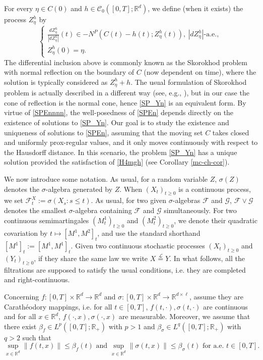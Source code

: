 \documentclass[preprint,12pt]{elsarticle}
\newcommand{\R}{\mathbb{R}}
\theoremstyle{plain}
\theoremstyle{definition}
\theoremstyle{remark}
\begin{document}
    For every $\eta\in C(0)$ and $h\in \mathcal{C}_0([0,T];\R^d)$, we define (when it exists) the process $Z^h_\eta$ by
	\begin{equation}\label{SP_Yn}
		\left\{\begin{array}{l}
			\frac{dZ^{h}_{\eta}}{|dZ^{h}_\eta|}(t) \in -N^P(C(t)-h(t);Z^{h}_{\eta}(t)), \ \left|dZ^h_\eta\right| \text {-a.e., }\\
			Z^h_{\eta}(0) = \eta.
		\end{array}\right.
	\end{equation}
	The differential inclusion above is commonly known as the Skorokhod problem with normal reflection on the boundary of $C$ (now dependent on time), where the solution is typically considered as $Z^h_\eta + h$. The usual formulation of Skorokhod problem is actually described in a different way (see, e.g., \cite{MR873889, MR529332, MR745330, MR2812587, Skorokhod1961}), but in our case the cone of reflection is the normal cone, hence \eqref{SP_Yn} is an equivalent form. By virtue of \eqref{SPEnnnn}, the well-posedness of \eqref{SPEn} depends directly on the existence of solutions to \eqref{SP_Yn}. Our goal is to study the existence and uniqueness of solutions to \eqref{SPEn}, assuming that the moving set $C$ takes closed and uniformly prox-regular values, and it only moves continuously with respect to the Hausdorff distance. In this scenario, the problem \eqref{SP_Yn} has a unique solution provided the satisfaction of \ref{H4mgh} (see Corollary \ref{mc-ch-cor}).
    
    We now introduce some notation. As usual, for a  random variable $Z$, $\sigma(Z)$ denotes the $\sigma$-algebra generated by $Z$. When $(X_t)_{t\geq 0}$ is a continuous process, we set $\mathcal{F}_t^X := \sigma(X_s:s\leq t)$. As usual, for two given $\sigma$-algebras $\mathcal{F}$ and $\mathcal{G}$, $\mathcal{F}\vee\mathcal{G}$ denotes the smallest $\sigma$-algebra containing $\mathcal{F}$ and $\mathcal{G}$ simultaneously. For two continuous semimartingales $(M^1_t)_{t\geq 0}$ and $(M_t^2)_{t\geq 0}$, we denote their quadratic covariation by $t\mapsto [M^1,M^2]_t$, and use the standard shorthand $[M^1]_t := [M^1,M^1]_t$. Given two continuous stochastic processes $(X_t)_{t\geq 0}$ and $(Y_t)_{t\geq 0}$, if they share the same law we write $X\stackrel{\mathscr{L}}{=}Y$. In what follows, all the filtrations are supposed to satisfy the usual conditions, i.e. they are completed and right-continuous.
	
	Concerning $f\colon [0,T]\times \R^d\to \R^d$ and $\sigma\colon [0,T]\times \R^d\to \R^{d\times \ell}$, assume they are Carathéodory mappings, i.e. for all $t\in[0,T]$, $f(t,\cdot),\sigma(t,\cdot)$ are continuous and for all $x\in \R^d$, $f(\cdot,x),\sigma(\cdot,x)$ are measurable. Moreover, we assume that there exist $\beta_f\in L^p([0,T];\R_+)$ with $p> 1$ and $\beta_\sigma\in L^q([0,T];\R_+)$ with $q>2$ such that 
    \begin{equation}\label{eqn_bounded_fsigma}
        \sup_{x\in \R^d}\|f(t,x)\|\leq \beta_f(t) \text{ and } \sup_{x\in \R^d}\|\sigma(t,x)\|\leq \beta_\sigma(t) \text{ for a.e. }t\in [0,T].
	\end{equation}
    
\end{document}
